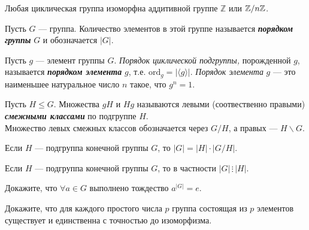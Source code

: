 \documentclass{article}
\begin{document}
    \begin{theorem_boxed}
        Любая циклическая группа изоморфна аддитивной группе $\mathbb{Z}$ или $\mathbb{Z}/n\mathbb{Z}$.
    \end{theorem_boxed}

    \begin{definition_boxed}
        Пусть $G$ — группа.
        Количество элементов в этой группе называется \textbf{\textit{порядком группы}} $G$ и обозначается $|G|.$
    \end{definition_boxed}

    \begin{definition_boxed}
        Пусть $g$ — элемент группы $G$. \textit{Порядок циклической подгруппы,} порожденной $g$, называется \textbf{\textit{порядком элемента}} $g$, т.е. $\text{ord}_g = |\langle g \rangle|$.
        \textit{Порядок элемента} $g$ — это наименьшее натуральное число $n$ такое, что $g^n = 1$.
    \end{definition_boxed}

    \begin{definition_boxed}
        Пусть $H \leq G$.
        Множества $gH$ и $Hg$ называются левыми (соотвественно правыми) \textbf{\textit{смежными классами}} по подгруппе $H$.\\
        Множество левых смежных классов обозначается через $G/H$, а правых — $H \backslash G$.
    \end{definition_boxed}

    \begin{theorem_boxed}[ (Лагранж)]
        Если $H$ — подгруппа конечной группы $G$, то $|G| = |H| \cdot |G/H|$.
    \end{theorem_boxed}


    \begin{example}
        Если $H$ — подгруппа конечной группы $G$, то в частности $|G| \,\vdots\, |H|$.
    \end{example}


    \begin{task_boxed}
        Докажите, что $\forall a \in G$ выполнено тождество $a^{|G|} = e.$
    \end{task_boxed}


    \begin{task_boxed}
        Докажите, что для каждого простого числа $p$ группа состоящая из $p$ элементов существует и единственна с точностью до изоморфизма.
    \end{task_boxed}
\end{document}
